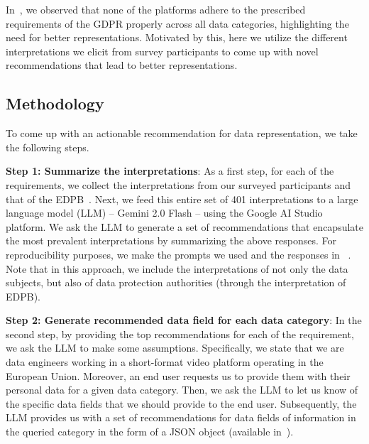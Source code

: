 In~, we observed that none of the platforms adhere to the prescribed requirements of the GDPR properly across all data categories, highlighting the need for better representations.
Motivated by this, here we utilize the different interpretations we elicit from survey participants to come up with novel recommendations that lead to better representations.%

\subsection{Methodology}
\label{Sec: RecMethodology}

To come up with an actionable recommendation for data representation, 
we take the following steps.


\noindent
\textbf{Step 1: Summarize the interpretations}: As a first step, for each of the requirements, we collect the interpretations from our surveyed participants and that of the EDPB~\cite{EDPB2018Transparency}.
Next, we feed this entire set of 401 interpretations to a large language model (LLM) -- Gemini 2.0 Flash \cite{google2024gemini}-- using the Google AI Studio platform. 
We ask the LLM to generate a set of recommendations that encapsulate the most prevalent interpretations by summarizing the above responses. For reproducibility purposes, we make the prompts we used and the responses in ~.
Note that in this approach, we include the interpretations of not only the data subjects, but also of data protection authorities (through the interpretation of EDPB). 

\noindent
\textbf{Step 2: Generate recommended data field for each data category}: In the second step, by providing the top recommendations for each of the requirement, we ask the LLM to make some assumptions.
Specifically, we state that we are data engineers working in a short-format video platform operating in the European Union.
Moreover, an end user requests us to provide them with their personal data for a given data category.
Then, we ask the LLM to let us know of the specific data fields that we should provide to the end user.
Subsequently, the LLM provides us with a set of recommendations for data fields of information in the queried category in the form of a JSON object (available in~). 

